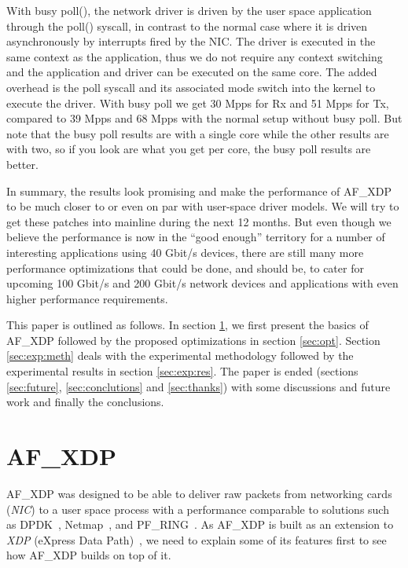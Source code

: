 \documentclass[9pt,numbers,reprint]{sigplanconf}
\begin{document}
With busy poll(), the network driver is driven by the user space
application through the poll() syscall, in contrast to the normal case
where it is driven asynchronously by interrupts fired by the NIC. The
driver is executed in the same context as the application, thus
we do not require any context switching and the application and driver
can be executed on the same core. The added overhead is the poll
syscall and its associated mode switch into the kernel to execute the
driver. With busy poll we get 30 Mpps for Rx and 51 Mpps for Tx,
compared to 39 Mpps and 68 Mpps with the normal setup without busy
poll. But note that the busy poll results are with a single core while
the other results are with two, so if you look are what you get per
core, the busy poll results are better.

In summary, the results look promising and make the performance of
AF\_XDP to be much closer to or even on par with user-space driver
models. We will try to get these patches into mainline during the next
12 months. But even though we believe the performance is now in the
``good enough'' territory for a number of interesting applications
using 40 Gbit/s devices, there are still many more performance
optimizations that could be done, and should be, to cater for upcoming
100 Gbit/s and 200 Gbit/s network devices and applications with even
higher performance requirements.

This paper is outlined as follows. In section \ref{sec:afxdp}, we
first present the basics of AF\_XDP followed by the proposed
optimizations in section \ref{sec:opt}. Section \ref{sec:exp:meth}
deals with the experimental methodology followed by the experimental
results in section \ref{sec:exp:res}. The paper is ended (sections
\ref{sec:future}, \ref{sec:conclutions} and \ref{sec:thanks}) with
some discussions and future work and finally the conclusions.


\section{AF\_XDP}
\label{sec:afxdp}

AF\_XDP was designed to be able to deliver raw packets from networking
cards (\emph{NIC}) to a user space process with a performance
comparable to solutions such as DPDK~\cite{dpdk},
Netmap~\cite{netmap}, and PF\_RING~\cite{pfring}. As AF\_XDP is built
as an extension to \emph{XDP} (eXpress Data Path)~\cite{xdp}, we need
to explain some of its features first to see how AF\_XDP builds on top
of it.
\end{document}
